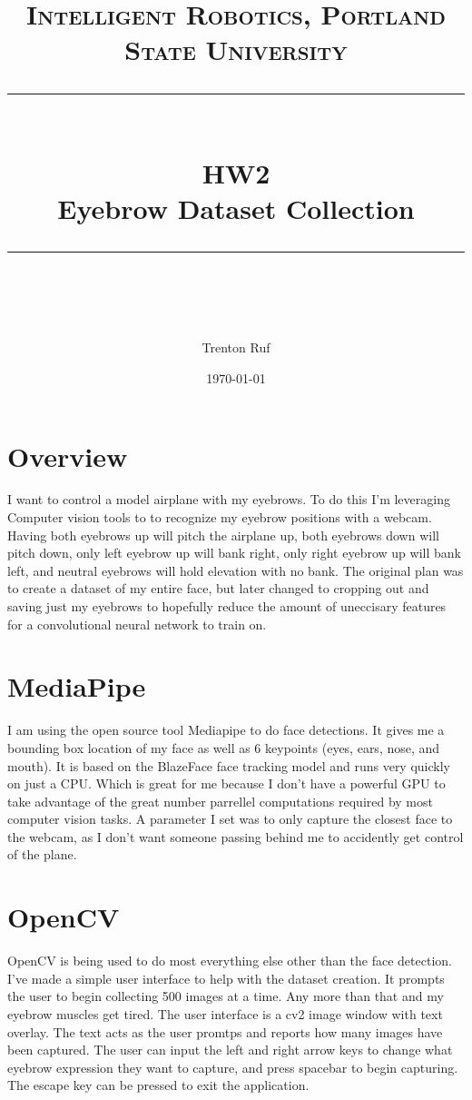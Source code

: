 \documentclass[11pt]{scrartcl} %
\title{	
	\normalfont\normalsize
	\textsc{Intelligent Robotics, Portland State University}\\ %
	\vspace{25pt} %
	\rule{\linewidth}{0.5pt}\\ %
	\vspace{20pt} %
	{\huge HW2}\\ %
	\vspace{4pt} %
	{\large Eyebrow Dataset Collection}\\ %
	\vspace{12pt} %
	\rule{\linewidth}{2pt}\\ %
	\vspace{12pt} %
}
\author{\LARGE Trenton Ruf} %
\date{\normalsize \today} %
\begin{document}
\maketitle %




\renewcommand\thesubsection{\Roman{subsection}}
\section{Overview}
I want to control a model airplane with my eyebrows. To do this I'm leveraging Computer vision tools to to recognize my eyebrow positions with a webcam. Having both eyebrows up will pitch the airplane up, both eyebrows down will pitch down, only left eyebrow up will bank right, only right eyebrow up will bank left, and neutral eyebrows will hold elevation with no bank. The original plan was to create a dataset of my entire face, but later changed to cropping out and saving just my eyebrows to hopefully reduce the amount of uneccisary features for a convolutional neural network to train on.

\section{MediaPipe}
I am using the open source tool Mediapipe to do face detections. It gives me a bounding box location of my face as well as 6 keypoints (eyes, ears, nose, and mouth).  
It is based on the BlazeFace face tracking model and runs very quickly on just a CPU. 
Which is great for me because I don't have a powerful GPU to take advantage of the great number parrellel computations required by most computer vision tasks.
A parameter I set was to only capture the closest face to the webcam, as I don't want someone passing behind me to accidently get control of the plane.

\section{OpenCV}
OpenCV is being used to do most everything else other than the face detection.
I've made a simple user interface to help with the dataset creation. 
It prompts the user to begin collecting 500 images at a time. Any more than that and my eyebrow muscles get tired.
The user interface is a cv2 image window with text overlay. The text acts as the user promtps and reports how many images have been captured.
The user can input the left and right arrow keys to change what eyebrow expression they want to capture, and press spacebar to begin capturing.
The escape key can be pressed to exit the application.
\end{document}
